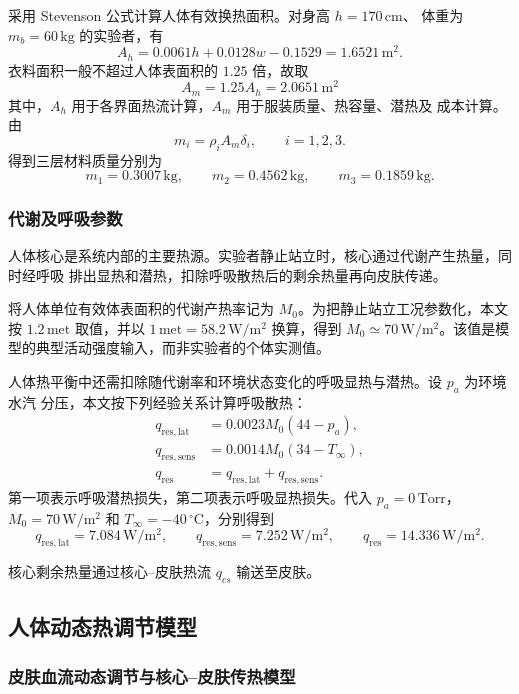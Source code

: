 \documentclass[withoutpreface,bwprint]{cumcmthesis}
\begin{document}
采用 Stevenson 公式计算人体有效换热面积。对身高 $h=170\,\mathrm{cm}$、
体重为 $m_b=60\,\mathrm{kg}$
的实验者，有
\[
A_h=0.0061h+0.0128w-0.1529=1.6521\,\mathrm{m^2}.
\]
衣料面积一般不超过人体表面积的 $1.25$ 倍，故取
\[
A_m=1.25A_h=2.0651\,\mathrm{m^2}
\]
其中，$A_h$ 用于各界面热流计算，$A_m$ 用于服装质量、热容量、潜热及
成本计算。由
\[
m_i=\rho_iA_m\delta_i,\qquad i=1,2,3.
\]
得到三层材料质量分别为
\[
m_1=0.3007\,\mathrm{kg},\qquad
m_2=0.4562\,\mathrm{kg},\qquad
m_3=0.1859\,\mathrm{kg}.
\]

\subsubsection{代谢及呼吸参数}

人体核心是系统内部的主要热源。实验者静止站立时，核心通过代谢产生热量，同时经呼吸
排出显热和潜热，扣除呼吸散热后的剩余热量再向皮肤传递。

将人体单位有效体表面积的代谢产热率记为 $M_0$。为把静止站立工况参数化，本文按
$1.2\,\mathrm{met}$ 取值，并以 $1\,\mathrm{met}=58.2\,\mathrm{W/m^2}$ 换算，得到
$M_0\simeq70\,\mathrm{W/m^2}$。该值是模型的典型活动强度输入，而非实验者的个体实测值。

人体热平衡中还需扣除随代谢率和环境状态变化的呼吸显热与潜热。设 $p_a$ 为环境水汽
分压，本文按下列经验关系计算呼吸散热：
\[
\begin{aligned}
q_{\mathrm{res,lat}}&=0.0023M_0(44-p_a),\\
q_{\mathrm{res,sens}}&=0.0014M_0(34-T_\infty),\\
q_{\mathrm{res}}&=q_{\mathrm{res,lat}}+q_{\mathrm{res,sens}}.
\end{aligned}
\]
第一项表示呼吸潜热损失，第二项表示呼吸显热损失。代入
$p_a=0\,\mathrm{Torr}$， $M_0=70\,\mathrm{W/m^2}$ 和
$T_\infty=-40\,^{\circ}\mathrm C$，分别得到
\[
q_{\mathrm{res,lat}}=7.084\,\mathrm{W/m^2},\qquad
q_{\mathrm{res,sens}}=7.252\,\mathrm{W/m^2},\qquad
q_{\mathrm{res}}=14.336\,\mathrm{W/m^2}.
\]

核心剩余热量通过核心--皮肤热流 $q_{cs}$ 输送至皮肤。

\subsection{人体动态热调节模型}

\subsubsection{皮肤血流动态调节与核心--皮肤传热模型}
\end{document}
